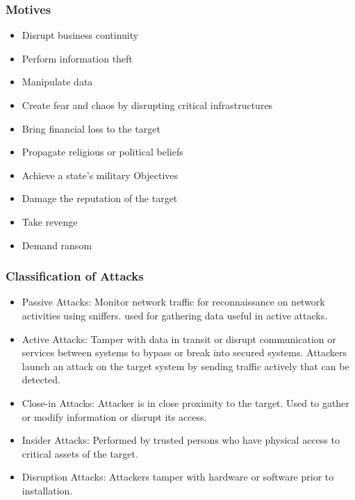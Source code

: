\subsubsection{Motives}
\begin{itemize}
    \item Disrupt business continuity
    \item Perform information theft
    \item Manipulate data
    \item Create fear and chaos by disrupting critical infrastructures
    \item Bring financial loss to the target
    \item Propagate religious or political beliefs
    \item Achieve a state's military Objectives
    \item Damage the reputation of the target
    \item Take revenge
    \item Demand ransom
\end{itemize} 

\subsubsection{Classification of Attacks}
\begin{itemize}
    \item Passive Attacks: Monitor network traffic for reconnaissance on network activities using sniffers.
    used for gathering data useful in active attacks.
    \item Active Attacks: Tamper with data in transit or disrupt communication or services between systems to bypass or break into secured systems.
    Attackers launch an attack on the target system by sending traffic actively that can be detected.
    \item Close-in Attacks: Attacker is in close proximity to the target.
    Used to gather or modify information or disrupt its access.
    \item Insider Attacks: Performed by trusted persons who have physical access to critical assets of the target.
    \item Disruption Attacks: Attackers tamper with hardware or software prior to installation.
\end{itemize}

